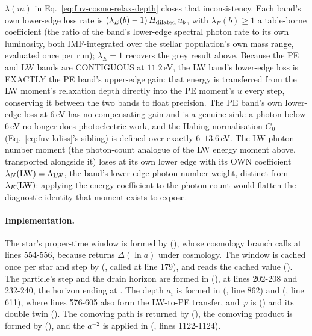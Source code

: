 $\lambda(m)$ in Eq.~\ref{eq:fuv-cosmo-relax-depth} closes that
inconsistency. Each band's own lower-edge loss rate is
$(\lambda_E(b)-1)\,H_{\rm dilated}\,u_b$, with $\lambda_E(b)\geq1$ a
table-borne coefficient (the ratio of the band's lower-edge spectral
photon rate to its own luminosity, both IMF-integrated over the stellar
population's own mass range, evaluated once per run); $\lambda_E=1$
recovers the grey result above. Because the PE and LW bands are
CONTIGUOUS at $11.2$\,eV, the LW band's lower-edge loss is EXACTLY the
PE band's upper-edge gain: that energy is transferred from the LW
moment's relaxation depth directly into the PE moment's $u$ every step,
conserving it between the two bands to float precision. The PE band's
own lower-edge loss at $6$\,eV has no compensating gain and is a genuine
sink: a photon below $6$\,eV no longer does photoelectric work, and the
Habing normalisation $G_0$ (Eq.~\ref{eq:fuv-kdiss}'s sibling) is defined
over exactly $6$--$13.6$\,eV. The LW photon-number moment (the
photon-count analogue of the LW energy moment above, transported
alongside it) loses at its own lower edge with its OWN coefficient
$\lambda_N({\rm LW})=\Lambda_{\rm LW}$,
the band's lower-edge photon-number weight, distinct from
$\lambda_E({\rm LW})$: applying the energy coefficient to the photon
count would flatten the diagnostic identity that moment exists to
expose.

\paragraph{Implementation.} The star's proper-time window is formed by
 (), whose
cosmology branch calls  at lines 554-556,
because  returns $\Delta(\ln a)$ under cosmology. The
window is cached once per star and step by 
(, called at line 179), and
 reads the cached value
(). The particle's step and the drain horizon are
formed in 
(), at lines 202-208 and 232-240,
the horizon ending at . The depth $a_i$ is formed
in  (,
line 862) and 
(, line 611), where lines 576-605 also form the
LW-to-PE transfer, and $\varphi$ is
 () and
its double twin (). The comoving path is returned
by 
(), the comoving product is formed by
(), and the $a^{-2}$ is applied in
(, lines 1122-1124).

